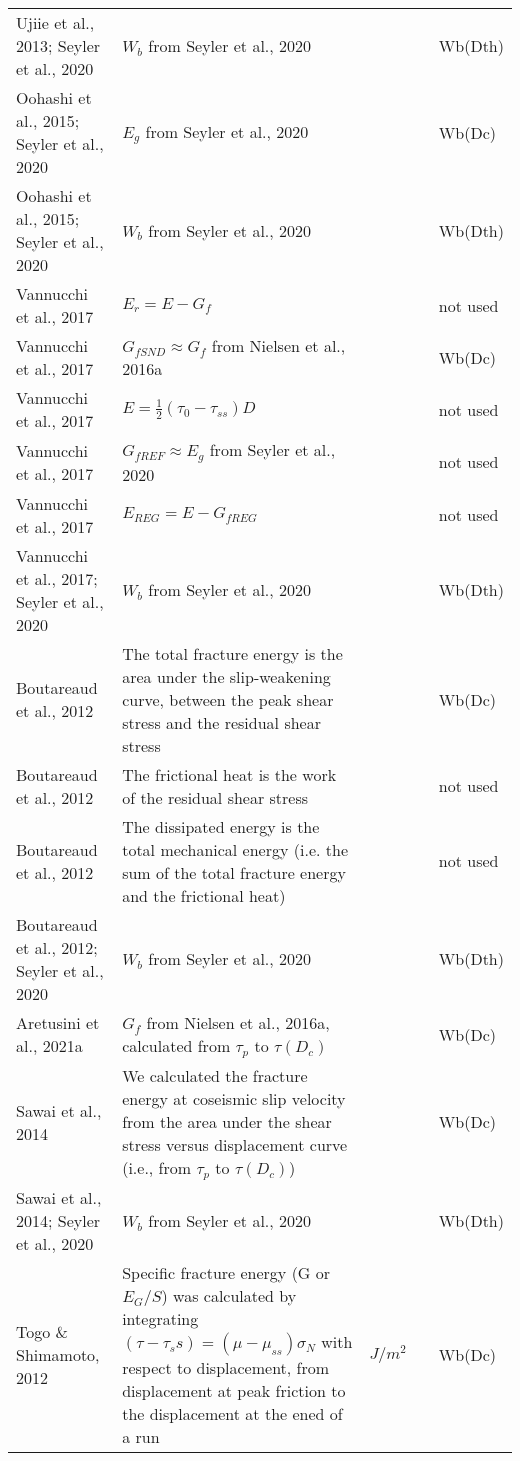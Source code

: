 \documentclass[12pt]{article}
\begin{document}
\begin{longtable}{|p{3.5 cm}|p{6.5 cm}|p{1.25 cm}|p{1.25 cm}|p{1.5 cm}|}
Ujiie et al., 2013; Seyler et al., 2020 & \( \displaystyle W_b \) from Seyler et al., 2020 & & & Wb(Dth) \\
Oohashi et al., 2015; Seyler et al., 2020 & \( \displaystyle E_g \) from Seyler et al., 2020 & & & Wb(Dc) \\
Oohashi et al., 2015; Seyler et al., 2020 & \( \displaystyle W_b \) from Seyler et al., 2020 & & & Wb(Dth) \\
Vannucchi et al., 2017 & \( \displaystyle E_r = E - G_f \) & & & not used \\
Vannucchi et al., 2017 & \( \displaystyle G_{fSND} \approx G_f\) from Nielsen et al., 2016a & & & Wb(Dc) \\
Vannucchi et al., 2017 & \( \displaystyle E = \frac{1}{2} (\tau_0 - \tau_{ss}) D \) & & & not used \\
Vannucchi et al., 2017 & \( \displaystyle G_{fREF} \approx E_g \) from Seyler et al., 2020 & & & not used \\
Vannucchi et al., 2017 & \( \displaystyle E_{REG} = E - G_{fREG} \) & & & not used \\
Vannucchi et al., 2017; Seyler et al., 2020 & \( \displaystyle W_b \) from Seyler et al., 2020 & & & Wb(Dth) \\
Boutareaud et al., 2012 & The total fracture energy is the area under the slip-weakening curve, between the peak shear stress and the residual shear stress & & & Wb(Dc) \\
Boutareaud et al., 2012 & The frictional heat is the work of the residual shear stress & & & not used \\
Boutareaud et al., 2012 & The dissipated energy is the total mechanical energy (i.e. the sum of the total fracture energy and the frictional heat) & & & not used \\
Boutareaud et al., 2012; Seyler et al., 2020 & \( \displaystyle W_b \) from Seyler et al., 2020 & & & Wb(Dth) \\
Aretusini et al., 2021a & \( \displaystyle G_f\) from Nielsen et al., 2016a, calculated from $\tau_p$ to $\tau(D_c)$ & & & Wb(Dc) \\
Sawai et al., 2014 & We calculated the fracture energy at coseismic slip velocity from the area under the shear stress versus displacement curve (i.e., from $\tau_p$ to $\tau(D_c)$) & & & Wb(Dc) \\
Sawai et al., 2014; Seyler et al., 2020 & \( \displaystyle W_b \) from Seyler et al., 2020 & & & Wb(Dth) \\
Togo \& Shimamoto, 2012 & Specific fracture energy (G or $E_G/S$) was calculated by integrating $(\tau-\tau_ss) = (\mu - \mu_{ss})\sigma_N$ with respect to displacement, from displacement at peak friction to the displacement at the ened of a run & $J/m^2$ & & Wb(Dc) \\

\end{longtable}
\end{document}

